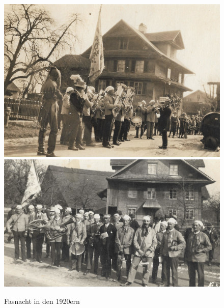 \documentclass[openany]{book}
\begin{document}
\begin{figure}[ht]
    \centerline{
        \includegraphics{./chap/1900-1925/Fasnacht-1920er-1.jpg}
        \includegraphics{./chap/1900-1925/Fasnacht-1920er-2.jpg}}
    \label{fig:mgh-fasnacht-1920}
    \caption{Fasnacht in den 1920ern}
\end{figure}
\clearpage
\end{document}
